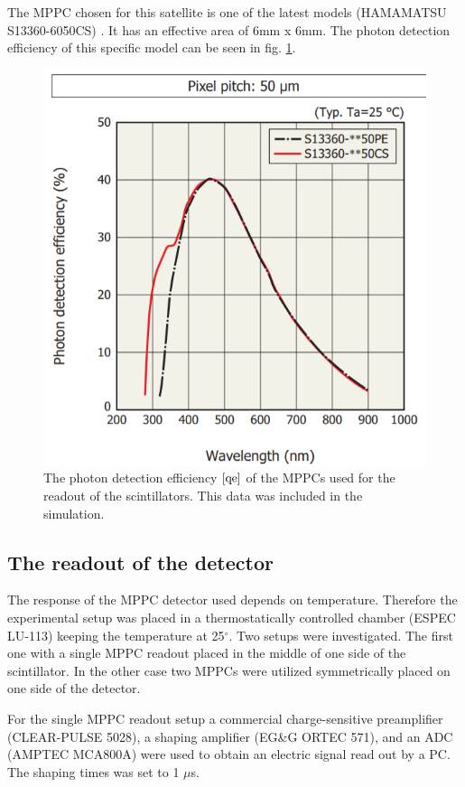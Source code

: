 \documentclass[12pt, a4paper,titlepage]{article}
\numberwithin{equation}{section}
\numberwithin{figure}{section}
\begin{document}
The MPPC chosen for this satellite is one of the latest models (HAMAMATSU S13360-6050CS) \cite{qe}. It has an effective area of 6mm x 6mm. The photon detection efficiency of this specific model can be seen in fig. \ref{fig:qe}.

\begin{figure}[H]
\centering
\includegraphics[width=130.0mm]{images/qe.png}
\caption{The photon detection efficiency $\cite{qe}$ of the MPPCs used for the readout of the scintillators. This data was included in the simulation.}
\label{fig:qe}
\end{figure}


\subsection{The readout of the detector}

The response of the MPPC detector used depends on temperature. Therefore the experimental setup was placed in a thermostatically controlled chamber (ESPEC LU-113) keeping the temperature at 25$^{\circ}$. Two setups were investigated. The first one with a single MPPC readout placed in the middle of one side of the scintillator. In the other case two MPPCs were utilized symmetrically placed on one side of the detector.

For the single MPPC readout setup a commercial charge-sensitive preamplifier (CLEAR-PULSE 5028), a shaping amplifier (EG\&G ORTEC 571), and an ADC (AMPTEC MCA800A) were used to obtain an electric signal read out by a PC. The shaping times was set to 1 $\mu$s.
\end{document}
